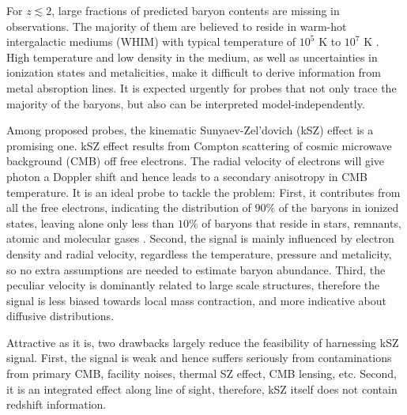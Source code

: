 For $z\lesssim 2$, large fractions of predicted baryon contents are missing in observations.  
The majority of them are believed to reside in warm-hot intergalactic mediums (WHIM) with typical temperature of $10^5$ K to $10^7$ K \cite{Pen1999,Soltan06}. 
High temperature and low density in the medium, 
as well as uncertainties in ionization states and metalicities, 
make it difficult to derive information from metal absroption lines. 
It is expected urgently for probes that not only trace the majority of the baryons, but also can be interpreted model-independently.

Among proposed probes, the kinematic Sunyaev-Zel'dovich (kSZ) effect \cite{Sunyaev72,Sunyaev80,Vishniac87} is a promising one.  
kSZ effect results from Compton scattering of cosmic microwave background (CMB) off free electrons. 
The radial velocity of electrons will give photon a Doppler shift 
and hence leads to a 
secondary anisotropy in CMB temperature.
It is an ideal probe to tackle the problem: 
First, it contributes from all the free electrons, indicating the distribution of $90\%$ of the baryons in ionized states,   
leaving alone only less than $10\%$ of baryons that 
reside in stars, remnants, atomic and molecular gases \cite{Fukugita04}. 
%
Second, the signal is mainly influenced by electron density and radial velocity, 
regardless the temperature, pressure and metalicity,  
so no extra assumptions are needed to estimate baryon abundance.  
%
Third, the peculiar velocity is dominantly related to large scale structures, 
therefore the signal is less biased towards local mass contraction, 
and more indicative about diffusive distributions.  

Attractive as it is, two drawbacks largely reduce the feasibility of harnessing kSZ signal.  
First, the signal is weak 
and hence suffers seriously from contaminations 
from primary CMB, facility noises, 
thermal SZ effect, CMB lensing, etc.  
Second, it is an integrated effect along line of sight, therefore, kSZ itself does not contain redshift information.

